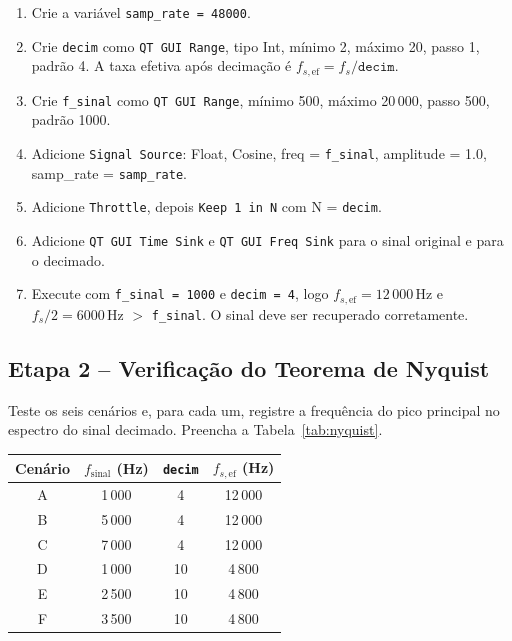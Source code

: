 \documentclass[11pt,a4paper]{article}
\begin{document}
\begin{instrucao}
\begin{enumerate}[label=\arabic*.]
  \item Crie a variável \texttt{samp\_rate = 48000}.
  \item Crie \texttt{decim} como \texttt{QT GUI Range}, tipo Int, mínimo 2,
    máximo 20, passo 1, padrão 4. A taxa efetiva após decimação é
    $f_{s,\text{ef}} = f_s/\texttt{decim}$.
  \item Crie \texttt{f\_sinal} como \texttt{QT GUI Range}, mínimo 500,
    máximo 20\,000, passo 500, padrão 1000.
  \item Adicione \texttt{Signal Source}: Float, Cosine, freq = \texttt{f\_sinal},
    amplitude = 1.0, samp\_rate = \texttt{samp\_rate}.
  \item Adicione \texttt{Throttle}, depois \texttt{Keep 1 in N} com
    N = \texttt{decim}.
  \item Adicione \texttt{QT GUI Time Sink} e \texttt{QT GUI Freq Sink} para
    o sinal original e para o decimado.
  \item Execute com \texttt{f\_sinal = 1000} e \texttt{decim = 4}, logo
    $f_{s,\text{ef}} = 12\,000$\,Hz e $f_s/2 = 6000$\,Hz $>$ \texttt{f\_sinal}.
    O sinal deve ser recuperado corretamente.
\end{enumerate}
\end{instrucao}

\subsection*{Etapa 2 -- Verificação do Teorema de Nyquist}

\begin{instrucao}
Teste os seis cenários e, para cada um, registre a frequência do pico
principal no espectro do sinal decimado. Preencha a Tabela~\ref{tab:nyquist}.

\begin{center}
\begin{tabular}{c c c c}
  \toprule
  Cenário & $f_\text{sinal}$ (Hz) & \texttt{decim} & $f_{s,\text{ef}}$ (Hz) \\
  \midrule
  A & 1\,000 & 4  & 12\,000 \\
  B & 5\,000 & 4  & 12\,000 \\
  C & 7\,000 & 4  & 12\,000 \\
  D & 1\,000 & 10 & 4\,800  \\
  E & 2\,500 & 10 & 4\,800  \\
  F & 3\,500 & 10 & 4\,800  \\
  \bottomrule
\end{tabular}
\end{center}
\end{instrucao}
\end{document}
